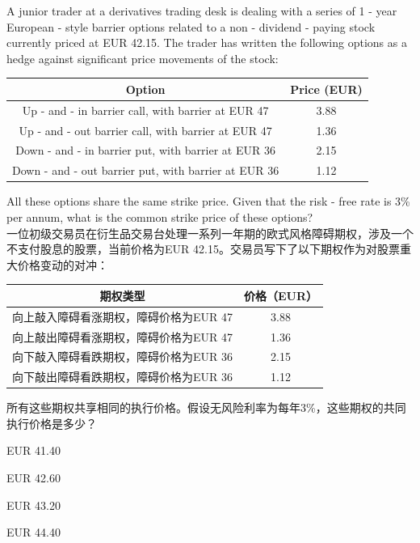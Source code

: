 \documentclass{article}
\newcounter{question} %
\begin{document}
\begin{question}
    A junior trader at a derivatives trading desk is dealing with a series of 1 - year European - style barrier options related to a non - dividend - paying stock currently priced at EUR 42.15. The trader has written the following options as a hedge against significant price movements of the stock:
    \begin{center}
    \begin{tabular}{|c|c|}
    \hline
    Option & Price (EUR) \\
    \hline
    Up - and - in barrier call, with barrier at EUR 47 & 3.88 \\
    \hline
    Up - and - out barrier call, with barrier at EUR 47 & 1.36 \\
    \hline
    Down - and - in barrier put, with barrier at EUR 36 & 2.15 \\
    \hline
    Down - and - out barrier put, with barrier at EUR 36 & 1.12 \\
    \hline
    \end{tabular}
    \end{center}
    All these options share the same strike price. Given that the risk - free rate is 3\% per annum, what is the common strike price of these options?
    \\一位初级交易员在衍生品交易台处理一系列一年期的欧式风格障碍期权，涉及一个不支付股息的股票，当前价格为EUR 42.15。交易员写下了以下期权作为对股票重大价格变动的对冲：
    \begin{center}
        \begin{tabular}{|c|c|}
        \hline
        期权类型 & 价格（EUR） \\
        \hline
        向上敲入障碍看涨期权，障碍价格为EUR 47 & 3.88 \\
        \hline
        向上敲出障碍看涨期权，障碍价格为EUR 47 & 1.36 \\
        \hline
        向下敲入障碍看跌期权，障碍价格为EUR 36 & 2.15 \\
        \hline
        向下敲出障碍看跌期权，障碍价格为EUR 36 & 1.12 \\
        \hline
        \end{tabular}
        \end{center}
        所有这些期权共享相同的执行价格。假设无风险利率为每年3\%，这些期权的共同执行价格是多少？
    \end{question}
    
    \begin{choices}
        \item EUR 41.40
        \item EUR 42.60
        \item EUR 43.20
        \item EUR 44.40
    \end{choices}
    
\end{document}
